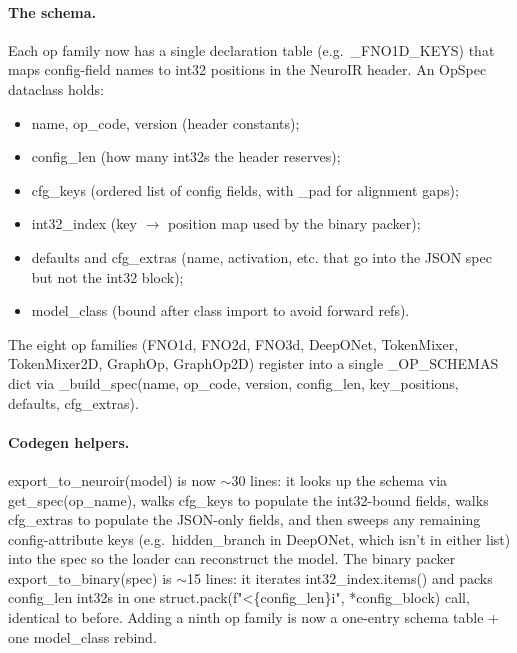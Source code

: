 \documentclass[10pt,twocolumn]{article}
\renewcommand{\texttt}[1]{{\normalfont\ttfamily #1}\normalfont\rmfamily}
\begin{document}
\paragraph{The schema.}
Each op family now has a single declaration
table (e.g.\ \texttt{\_FNO1D\_KEYS}) that maps
config-field names to int32 positions in the
NeuroIR header.  An \texttt{OpSpec} dataclass
holds:
\begin{itemize}
\item \texttt{name}, \texttt{op\_code},
      \texttt{version} (header constants);
\item \texttt{config\_len} (how many int32s the
      header reserves);
\item \texttt{cfg\_keys} (ordered list of
      config fields, with \texttt{\_pad} for
      alignment gaps);
\item \texttt{int32\_index} (\texttt{key $\to$
      position} map used by the binary packer);
\item \texttt{defaults} and \texttt{cfg\_extras}
      (\texttt{name}, \texttt{activation}, etc.
      that go into the JSON spec but not the
      int32 block);
\item \texttt{model\_class} (bound after
      class import to avoid forward refs).
\end{itemize}
The eight op families (FNO1d, FNO2d, FNO3d,
DeepONet, TokenMixer, TokenMixer2D, GraphOp,
GraphOp2D) register into a single
\texttt{\_OP\_SCHEMAS} dict via
\texttt{\_build\_spec(name, op\_code, version,
config\_len, key\_positions, defaults,
cfg\_extras)}.

\paragraph{Codegen helpers.}
\texttt{export\_to\_neuroir(model)} is now
$\sim$30 lines: it looks up the schema via
\texttt{get\_spec(op\_name)}, walks
\texttt{cfg\_keys} to populate the int32-bound
fields, walks \texttt{cfg\_extras} to populate
the JSON-only fields, and then sweeps any
remaining config-attribute keys (e.g.\
\texttt{hidden\_branch} in DeepONet, which
isn't in either list) into the spec so the
loader can reconstruct the model.  The
binary packer \texttt{export\_to\_binary(spec)}
is $\sim$15 lines: it iterates
\texttt{int32\_index.items()} and packs
\texttt{config\_len} int32s in one
\texttt{struct.pack(f"<\{config\_len\}i", *config\_block)}
call, identical to before.  Adding a ninth op
family is now a one-entry schema table + one
\texttt{model\_class} rebind.
\end{document}
